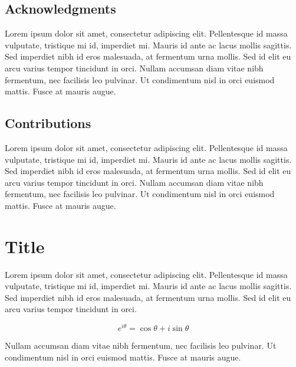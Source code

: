 \documentclass[]{hdsr}
\begin{document}
\subsection*{Acknowledgments}
Lorem ipsum dolor sit amet, consectetur adipiscing elit. Pellentesque id massa vulputate, tristique mi id, imperdiet mi. Mauris id ante ac lacus mollis sagittis. Sed imperdiet nibh id eros malesuada, at fermentum urna mollis. Sed id elit eu arcu varius tempor tincidunt in orci. Nullam accumsan diam vitae nibh fermentum, nec facilisis leo pulvinar. Ut condimentum nisl in orci euismod mattis. Fusce at mauris augue. 
 
\subsection*{Contributions}
Lorem ipsum dolor sit amet, consectetur adipiscing elit. Pellentesque id massa vulputate, tristique mi id, imperdiet mi. Mauris id ante ac lacus mollis sagittis. Sed imperdiet nibh id eros malesuada, at fermentum urna mollis. Sed id elit eu arcu varius tempor tincidunt in orci. Nullam accumsan diam vitae nibh fermentum, nec facilisis leo pulvinar. Ut condimentum nisl in orci euismod mattis. Fusce at mauris augue. 


\appendix

\section{Title}
\label{appendix-customize-this-label}
Lorem ipsum dolor sit amet, consectetur adipiscing elit. Pellentesque id massa vulputate, tristique mi id, imperdiet mi. Mauris id ante ac lacus mollis sagittis. Sed imperdiet nibh id eros malesuada, at fermentum urna mollis. Sed id elit eu arcu varius tempor tincidunt in orci. 

\begin{equation}
e^{i\theta} = \cos \theta + i\sin \theta
\end{equation}

Nullam accumsan diam vitae nibh fermentum, nec facilisis leo pulvinar. Ut condimentum nisl in orci euismod mattis. Fusce at mauris augue. 


\printbibliography
\end{document}
